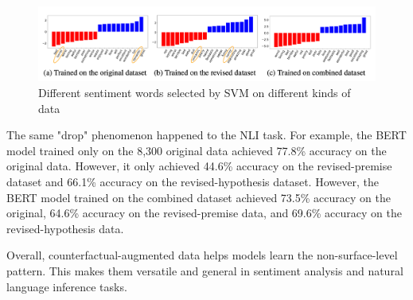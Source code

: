 \documentclass[aoas]{imsart}
\numberwithin{equation}{section}
\theoremstyle{plain}
\theoremstyle{remark}
\begin{document}
\begin{figure}[ht]
\includegraphics[scale=0.4]{img/com.png}
\caption{Different sentiment words selected by SVM on different kinds of data}
\label{Fig8: com}
\end{figure}

The same "drop" phenomenon happened to the NLI task. For example, the BERT model trained only on the 8,300 original data achieved 77.8\% accuracy on the original data. However, it only achieved 44.6\% accuracy on the revised-premise dataset and 66.1\% accuracy on the revised-hypothesis dataset. However, the BERT model trained on the combined dataset achieved 73.5\% accuracy on the original, 64.6\% accuracy on the revised-premise data, and 69.6\% accuracy on the revised-hypothesis data. 

Overall, counterfactual-augmented data helps models learn the non-surface-level pattern. This makes them versatile and general in sentiment analysis and natural language inference tasks.
\end{document}
